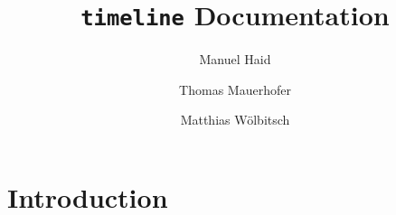 \documentclass[11pt, a4paper]{article}
\author{Manuel Haid \and Thomas Mauerhofer \and Matthias Wölbitsch}
\title{\texttt{timeline} Documentation}
\begin{document}
\maketitle
\tableofcontents

\section{Introduction} \label{sec:intoduction}
\end{document}
